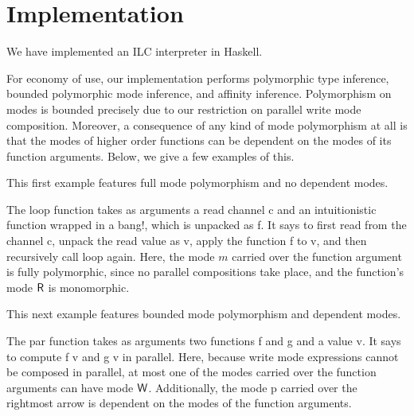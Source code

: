 \section{Implementation}
\label{sec:implementation}

We have implemented an ILC interpreter in Haskell.

For economy of use, our implementation performs polymorphic type inference,
bounded polymorphic mode inference, and affinity inference. Polymorphism on
modes is bounded precisely due to our restriction on parallel write mode
composition. Moreover, a consequence of any kind of mode polymorphism at all is
that the modes of higher order functions can be dependent on the modes of its
function arguments. Below, we give a few examples of this.

This first example features full mode polymorphism and no dependent modes.

The \textsf{loop} function
takes as arguments a read channel \textsf{c} and an intuitionistic function
wrapped in a bang!, which is unpacked as \textsf{f}.  It says to first read from
the channel \textsf{c}, unpack the read value as \textsf{v}, apply the function
\textsf{f} to \textsf{v}, and then recursively call \textsf{loop} again. Here,
the mode $m$ carried over the function argument is fully polymorphic, since no
parallel compositions take place, and the function's mode $\textsf{R}$ is monomorphic.

This next example features bounded mode polymorphism and dependent modes.

The \textsf{par} function takes as arguments two functions \textsf{f} and
\textsf{g} and a value \textsf{v}. It says to compute \textsf{f v} and \textsf{g
  v} in parallel. Here, because write mode expressions cannot be composed in
parallel, at most one of the modes carried over the function arguments can have
mode $\textsf{W}$. Additionally, the mode \textsf{p} carried over the rightmost arrow
is dependent on the modes of the function arguments.
